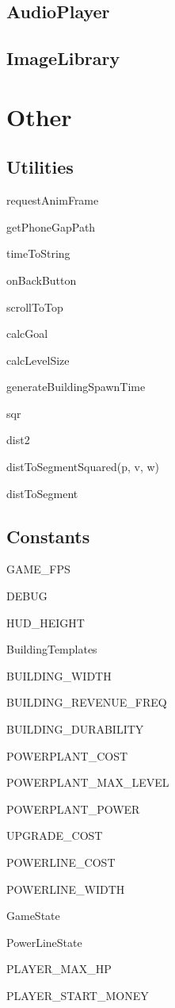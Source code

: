 	\subsection*{AudioPlayer}

	\subsection*{ImageLibrary}

	\clearpage

\section{Other}

\subsection*{Utilities}

	requestAnimFrame

	getPhoneGapPath

	timeToString

	onBackButton

	scrollToTop

	calcGoal

	calcLevelSize

	generateBuildingSpawnTime

	sqr

	dist2

	distToSegmentSquared(p, v, w)

	distToSegment


\subsection*{Constants}
	
	GAME\_FPS

	DEBUG

	HUD\_HEIGHT

	BuildingTemplates

	BUILDING\_WIDTH

	BUILDING\_REVENUE\_FREQ

	BUILDING\_DURABILITY

	POWERPLANT\_COST

	POWERPLANT\_MAX\_LEVEL

	POWERPLANT\_POWER

	UPGRADE\_COST

	POWERLINE\_COST

	POWERLINE\_WIDTH

	GameState

	PowerLineState

	PLAYER\_MAX\_HP

	PLAYER\_START\_MONEY

